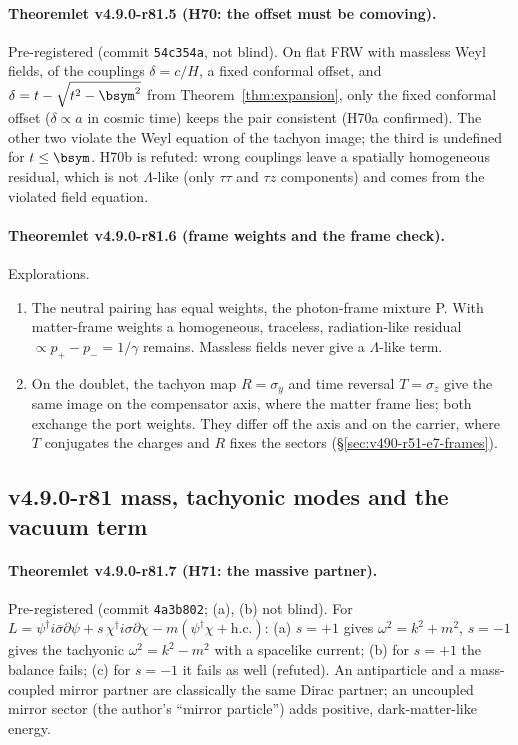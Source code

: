 \paragraph{Theoremlet v4.9.0-r81.5 (H70: the offset must be comoving).}
Pre-registered (commit \texttt{54c354a}, not blind).  On flat FRW with massless Weyl fields, of the couplings \(\delta=c/H\), a fixed conformal
offset, and \(\delta=t-\sqrt{t^2-\bsym^2}\) from Theorem~\ref{thm:expansion}, only the fixed conformal offset (\(\delta\propto a\) in cosmic time) keeps
the pair consistent (H70a confirmed).  The other two violate the Weyl equation of the tachyon image; the third is undefined for
\(t\le\bsym\).  H70b is refuted: wrong couplings leave a spatially homogeneous residual, which is not \(\Lambda\)-like (only
\(\tau\tau\) and \(\tau z\) components) and comes from the violated field equation.

\paragraph{Theoremlet v4.9.0-r81.6 (frame weights and the frame check).}
Explorations.
\begin{enumerate}[leftmargin=2em]
\item[(a)] The neutral pairing has equal weights, the photon-frame mixture P.  With matter-frame weights a homogeneous, traceless,
radiation-like residual \(\propto p_+-p_-=1/\gamma\) remains.  Massless fields never give a \(\Lambda\)-like term.
\item[(b)] On the doublet, the tachyon map \(R=\sigma_y\) and time reversal \(T=\sigma_z\) give the same image on the compensator axis, where
the matter frame lies; both exchange the port weights.  They differ off the axis and on the carrier, where \(T\) conjugates the charges
and \(R\) fixes the sectors (\S\ref{sec:v490-r51-e7-frames}).
\end{enumerate}

\subsection*{v4.9.0-r81 mass, tachyonic modes and the vacuum term}
\label{subsec:v490-r81-vacuum}

\paragraph{Theoremlet v4.9.0-r81.7 (H71: the massive partner).}
Pre-registered (commit \texttt{4a3b802}; (a), (b) not blind).  For \(L=\psi^\dagger i\bar\sigma\partial\psi+s\,\chi^\dagger i\sigma\partial\chi-m(\psi^\dagger\chi+\mathrm{h.c.})\):
(a) \(s=+1\) gives \(\omega^2=k^2+m^2\), \(s=-1\) gives the tachyonic \(\omega^2=k^2-m^2\) with a spacelike current; (b) for \(s=+1\) the
balance fails; (c) for \(s=-1\) it fails as well (refuted).  An antiparticle and a mass-coupled mirror partner are classically the same
Dirac partner; an uncoupled mirror sector (the author's ``mirror particle'') adds positive, dark-matter-like energy.

